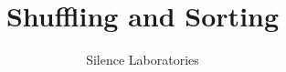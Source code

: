 \documentclass{article}
\begin{document}
\title{Shuffling and Sorting}
\author{Silence Laboratories}
\maketitle





\end{document}
